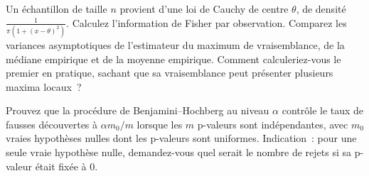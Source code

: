 \begin{question}\label{iq:iv1:statistics:39}
Un échantillon de taille $n$ provient d'une loi de Cauchy de centre $\theta$, de densité $\frac{1}{\pi(1 + (x - \theta)^2)}$. Calculez l'information de Fisher par observation. Comparez les variances asymptotiques de l'estimateur du maximum de vraisemblance, de la médiane empirique et de la moyenne empirique. Comment calculeriez-vous le premier en pratique, sachant que sa vraisemblance peut présenter plusieurs maxima locaux~?
\end{question}

\begin{question}\label{iq:iv1:statistics:40}
Prouvez que la procédure de Benjamini--Hochberg au niveau $\alpha$ contrôle le taux de fausses découvertes à $\alpha m_0/m$ lorsque les $m$ p-valeurs sont indépendantes, avec $m_0$ vraies hypothèses nulles dont les p-valeurs sont uniformes. Indication~: pour une seule vraie hypothèse nulle, demandez-vous quel serait le nombre de rejets si sa p-valeur était fixée à 0.
\end{question}
